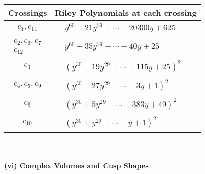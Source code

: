 \documentclass[1p]{elsarticle_modified}
\theoremstyle{definition}
\begin{document}
\begin{tabular}{m{50pt}|m{274pt}}
Crossings & \hspace{64pt}Riley Polynomials at each crossing \\
\hline $$\begin{aligned}c_{1},c_{11}\end{aligned}$$&$\begin{aligned}
&y^{60}-21 y^{59}+\cdots-20300 y+625
\end{aligned}$\\
\hline $$\begin{aligned}c_{2},c_{6},c_{7}\\c_{12}\end{aligned}$$&$\begin{aligned}
&y^{60}+35 y^{59}+\cdots+40 y+25
\end{aligned}$\\
\hline $$\begin{aligned}c_{3}\end{aligned}$$&$\begin{aligned}
&(y^{30}-19 y^{29}+\cdots+115 y+25)^{2}
\end{aligned}$\\
\hline $$\begin{aligned}c_{4},c_{5},c_{9}\end{aligned}$$&$\begin{aligned}
&(y^{30}-27 y^{29}+\cdots+3 y+1)^{2}
\end{aligned}$\\
\hline $$\begin{aligned}c_{8}\end{aligned}$$&$\begin{aligned}
&(y^{30}+5 y^{29}+\cdots+383 y+49)^{2}
\end{aligned}$\\
\hline $$\begin{aligned}c_{10}\end{aligned}$$&$\begin{aligned}
&(y^{30}+y^{29}+\cdots- y+1)^{2}
\end{aligned}$\\
\hline
\end{tabular}\\~\\
\newpage\flushleft \textbf{(vi) Complex Volumes and Cusp Shapes}
\end{document}
